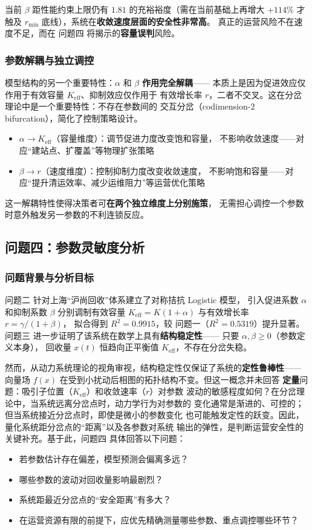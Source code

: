 \documentclass[12pt,a4paper]{ctexart}
\begin{document}
当前 $\beta$ 距性能约束上限仍有 $1.81$ 的充裕裕度（需在当前基础上再增大
$+114\%$ 才触及 $r_{\min}$ 底线），系统在\textbf{收敛速度层面的安全性非常高}。
真正的运营风险不在速度不足，而在 问题四 将揭示的\textbf{容量误判}风险。

\subsubsection{参数解耦与独立调控}

模型结构的另一个重要特性：$\alpha$ 和 $\beta$ \textbf{作用完全解耦}——
本质上是因为促进效应仅作用于有效容量 $K_{\text{eff}}$、抑制效应仅作用于
有效增长率 $r$，二者不交叉。这在分岔理论中是一个重要特性：不存在参数间的
交互分岔（codimension-2 bifurcation），简化了控制策略设计。
\begin{itemize}
  \item $\alpha \to K_{\text{eff}}$（容量维度）：调节促进力度改变饱和容量，
        不影响收敛速度——对应``建站点、扩覆盖''等物理扩张策略
  \item $\beta \to r$（速度维度）：控制抑制力度改变收敛速度，
        不影响饱和容量——对应``提升清运效率、减少运维阻力''等运营优化策略
\end{itemize}

这一解耦特性使得决策者可\textbf{在两个独立维度上分别施策}，
无需担心调控一个参数时意外触发另一参数的不利连锁反应。

\subsection{问题四：参数灵敏度分析}

\subsubsection{问题背景与分析目标}

问题二 针对上海``沪尚回收''体系建立了对称拮抗 Logistic 模型，
引入促进系数 $\alpha$ 和抑制系数 $\beta$ 分别调制有效容量 $K_{\text{eff}} = K(1+\alpha)$
与有效增长率 $r = \gamma/(1+\beta)$，
拟合得到 $R^2 = 0.9915$，较 问题一（$R^2 = 0.5319$）提升显著。
问题三 进一步证明了该系统在数学上具有\textbf{结构稳定性}——
只要 $\alpha, \beta \geq 0$（参数定义本身），
回收量 $x(t)$ 恒趋向正平衡值 $K_{\text{eff}}$，不存在分岔失稳。

然而，从动力系统理论的视角审视，结构稳定性仅保证了系统的\textbf{定性鲁棒性}——
向量场 $f(x)$ 在受到小扰动后相图的拓扑结构不变。但这一概念并未回答
\textbf{定量}问题：吸引子位置（$K_{\text{eff}}$）和收敛速率（$r$）对参数
波动的敏感程度如何？在分岔理论中，当系统远离分岔点时，动力学行为对参数的
变化通常是渐进的、可控的；但当系统接近分岔点时，即使是微小的参数变化
也可能触发定性的跃变。因此，量化系统距分岔点的``距离''以及各参数对系统
输出的弹性，是判断运营安全性的关键补充。基于此，问题四 具体回答以下问题：
\begin{itemize}
  \item 若参数估计存在偏差，模型预测会偏离多远？
  \item 哪些参数的波动对回收量影响最剧烈？
  \item 系统距最近分岔点的``安全距离''有多大？
  \item 在运营资源有限的前提下，应优先精确测量哪些参数、重点调控哪些环节？
\end{itemize}
\end{document}

